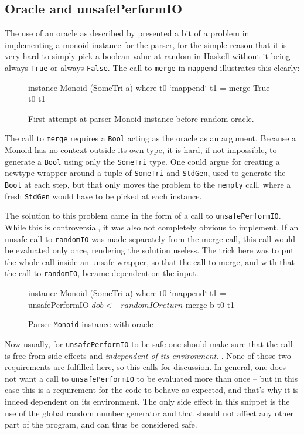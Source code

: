\documentclass[a4paper,12pt,twosided]{report}
\renewcommand\cite{\citep}
\begin{document}
\subsection{Oracle and unsafePerformIO}
\label{oraclesection}
The use of an oracle as described by \citeauthor{parparsepaper} presented a bit
of a problem in implementing a monoid instance for the parser, for the simple
reason that it is very hard to simply pick a boolean value at random in Haskell
without it being always \texttt{True} or always \texttt{False}. The call to
\texttt{merge} in \texttt{mappend} illustrates this clearly:

\begin{figure}[H]
\begin{code}
instance Monoid (SomeTri a) where
    t0 `mappend` t1 = merge True t0 t1
\end{code}
\caption{First attempt at parser Monoid instance before random oracle.}
\end{figure}

The call to \texttt{merge} requires a \texttt{Bool} acting as the oracle as an
argument. Because a Monoid has no context outside its own type, it is hard, if not
impossible, to generate a \texttt{Bool} using only the \texttt{SomeTri} type.
One could argue for creating a newtype wrapper around a tuple of
\texttt{SomeTri} and \texttt{StdGen}, used to generate the \texttt{Bool} at each
step, but that only moves the problem to the \texttt{mempty}
call, where a fresh \texttt{StdGen} would have to be picked at each instance.

The solution to this problem came in the form of a call to \texttt{unsafePerformIO}.
While this is controversial, it was also not completely obvious to implement. If
an unsafe call to \texttt{randomIO} was made separately from the merge call, this call
would be evaluated only once, rendering the solution useless. The trick here was
to put the whole call inside an unsafe wrapper, so that the call to merge, and
with that the call to \texttt{randomIO}, became dependent on the input.

\begin{figure}[H]
\begin{code}
instance Monoid (SomeTri a) where
    t0 `mappend` t1 = unsafePerformIO $ do
      b <- randomIO
      return $ merge b t0 t1
\end{code}
\caption{Parser \texttt{Monoid} instance with oracle}
\end{figure}

Now usually, for \texttt{unsafePerformIO} to be safe one should make sure that
the call is free from side effects and \textit{independent of its environment}.
\cite{unsafeHackage}. None of those two requirements are fulfilled here, so 
this calls for discussion. In general, one does not want a call to
\texttt{unsafePerformIO} to be evaluated more than once -- but in this case this
is a requirement for the code to behave as expected, and that's why it is indeed
dependent on its environment. The only side effect in this snippet is the use of
the global random number generator and that should not affect any other part of
the program, and can thus be considered safe.
\end{document}
